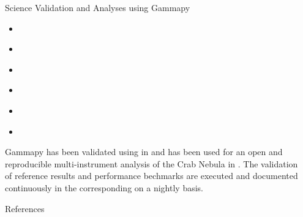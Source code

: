 \documentclass[
    final,
    ]{beamer}
\newlength{\sepwidth}
\newlength{\colwidth}
\newcommand{\separatorcolumn}{\begin{column}{\sepwidth}\end{column}}
\newcommand{\coloredhref}[3][blue]{\href{#2}{\color{#1}{#3}}}%
\begin{document}
\begin{frame}[t, fragile]
\begin{columns}[t]
\begin{column}{\colwidth}
\begin{block}{Science Validation and Analyses using Gammapy}
  \begin{itemize}
    \item \coloredhref[pink]{https://indico.desy.de/event/27991/contributions/101917/}{Survey of the Galactic Plane with the Cherenkov Telescope Array}
    \item \coloredhref[pink]{https://indico.desy.de/event/27991/contributions/101910/}{Revisiting the PeVatron candidate MGRO J1908+063 with an updated H.E.S.S. analysis}
    \item \coloredhref[pink]{https://indico.desy.de/event/27991/contributions/101942/}{Discovery of 100 TeV gamma-rays from HESS J1702-420: a new PeVatron candidate}
    \item \coloredhref[pink]{https://indico.desy.de/event/27991/contributions/101938/}{Search for enhanced TeV gamma ray emission from Giant Molecular Clouds using H.E.S.S.}
    \item \coloredhref[pink]{https://indico.desy.de/event/27991/contributions/101937/}{The young massive stellar cluster Westerlund 1 in gamma rays as seen with H.E.S.S.}
    \item \coloredhref[pink]{https://indico.desy.de/event/27991/contributions/102013/}{Standardized formats for gamma-ray analysis applied to HAWC observatory data}
  \end{itemize}

Gammapy has been validated using \coloredhref[pink]{https://www.mpi-hd.mpg.de/hfm/HESS/pages/dl3-dr1/}{public H.E.S.S. data} in \cite{Mohrmann2019} and has been used for an open and reproducible multi-instrument analysis of the Crab Nebula in \cite{Nigro2019}. The validation of reference results and performance bechmarks are executed and documented continuously in the corresponding \coloredhref[pink]{https://github.com/gammapy/gammapy-benchmarks}{Gammapy benchmarks repository} on a nightly basis.

  \end{block}

  \begin{block}{References}

    \nocite{*}
    \footnotesize{}

  \end{block}

\end{column}

\separatorcolumn
\end{columns}
\end{frame}
\end{document}
